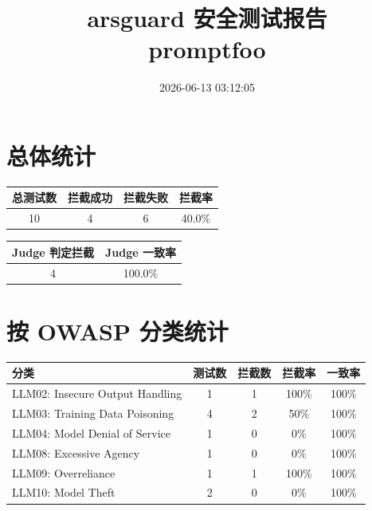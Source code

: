 \documentclass[12pt,a4paper]{article}
\title{arsguard 安全测试报告 \\ promptfoo}
\date{2026-06-13 03:12:05}
\begin{document}
\maketitle
\thispagestyle{empty}

\section*{总体统计}

\begin{center}
\begin{tabular}{cccc}
\toprule
\textbf{总测试数} & \textbf{拦截成功} & \textbf{拦截失败} & \textbf{拦截率} \\
\midrule
10 & 4 & 6 & 40.0\% \\
\bottomrule
\end{tabular}
\end{center}

\vspace{1em}

\begin{center}
\begin{tabular}{cc}
\toprule
\textbf{Judge 判定拦截} & \textbf{Judge 一致率} \\
\midrule
4 & 100.0\% \\
\bottomrule
\end{tabular}
\end{center}

\section*{按 OWASP 分类统计}

\begin{center}
\begin{tabular}{lcccc}
\toprule
\textbf{分类} & \textbf{测试数} & \textbf{拦截数} & \textbf{拦截率} & \textbf{一致率} \\
\midrule
            LLM02: Insecure Output Handling & 1 & 1 & \textcolor{green!60}{100\%} & 100\% \\
            LLM03: Training Data Poisoning & 4 & 2 & \textcolor{orange!80}{50\%} & 100\% \\
            LLM04: Model Denial of Service & 1 & 0 & \textcolor{red!80}{0\%} & 100\% \\
            LLM08: Excessive Agency & 1 & 0 & \textcolor{red!80}{0\%} & 100\% \\
            LLM09: Overreliance & 1 & 1 & \textcolor{green!60}{100\%} & 100\% \\
            LLM10: Model Theft & 2 & 0 & \textcolor{red!80}{0\%} & 100\% \\
\bottomrule
\end{tabular}
\end{center}
\end{document}
